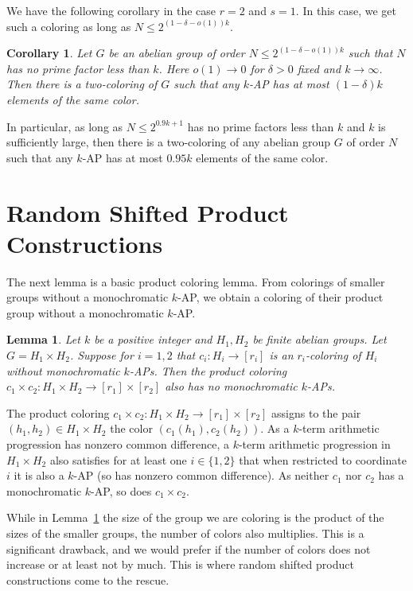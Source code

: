 \documentclass[11pt]{article}
\makeatletter
\numberwithin{equation}{section}
\renewenvironment{proof}[1][\proofname]{\par
  \vspace{-\topsep}%
  \pushQED{\qed}%
  \normalfont
  \topsep0pt \partopsep0pt %
  \trivlist
  \item[\hskip\labelsep
        \itshape
    #1\@addpunct{.}]\ignorespaces
}{%
  \popQED\endtrivlist\@endpefalse
  \addvspace{6pt plus 6pt} %
}
\newtheorem{lem}[result]{Lemma}
\newtheorem{cor}[result]{Corollary}
\theoremstyle{definition}
\theoremstyle{remark}
\makeatother
\begin{document}
We have the following corollary in the case $r=2$ and $s=1$. In this case, we get such a coloring as long as $N \leq 2^{(1-\delta-o(1))k}$. 

\begin{cor}\label{lllcor2}
Let $G$ be an abelian group of order $N \leq 2^{(1-\delta-o(1))k}$ such that $N$ has no prime factor less than $k$. Here  $o(1) \rightarrow 0$ for $\delta>0$ fixed and $k \to \infty$. Then there is a two-coloring of $G$ such that any $k$-AP has at most $(1-\delta)k$ elements of the same color. 
\end{cor}

In particular, as long as $N \leq 2^{0.9k+1}$ has no prime factors less than $k$ and $k$ is sufficiently large, then there is a two-coloring of any abelian group $G$ of order $N$ such that any $k$-AP has at most $0.95k$ elements of the same color. 


\section{Random Shifted Product Constructions}
\label{sectionrspc}
The next lemma is a basic product coloring lemma. From colorings of smaller groups without a monochromatic $k$-AP, we obtain a coloring of their product group without a monochromatic $k$-AP. 

\begin{lem}\label{simpleproductcoloring} Let $k$ be a positive integer and $H_1,H_2$ be finite abelian groups. Let $G=H_1 \times H_2$. Suppose for $i=1,2$ that $c_i:H_i \to [r_i]$ is an $r_i$-coloring of $H_i$ without monochromatic $k$-APs. Then the product coloring $c_1 \times c_2:H_1 \times H_2 \to [r_1] \times [r_2]$ also has no monochromatic $k$-APs. 
\end{lem}
\begin{proof}
The product coloring $c_1 \times c_2: H_1 \times H_2 \rightarrow [r_1] \times [r_2]$ assigns to the pair $(h_1,h_2) \in H_1 \times H_2$ the color $(c_1(h_1),c_2(h_2))$. As a $k$-term arithmetic progression has nonzero common difference, a $k$-term arithmetic progression in $H_1 \times H_2$ also satisfies for at least one $i \in \{1,2\}$ that when restricted to coordinate $i$ it is also a $k$-AP (so has nonzero common difference). As neither $c_1$ nor $c_2$ has a monochromatic $k$-AP, so does $c_1 \times c_2$. 
\end{proof}

While in Lemma~\ref{simpleproductcoloring} the size of the group we are coloring is the product of the sizes of the smaller groups, the number of colors also multiplies. This is a significant drawback, and we would prefer if the number of colors does not increase or at least not by much. This is where random shifted product constructions come to the rescue. 
\end{document}

